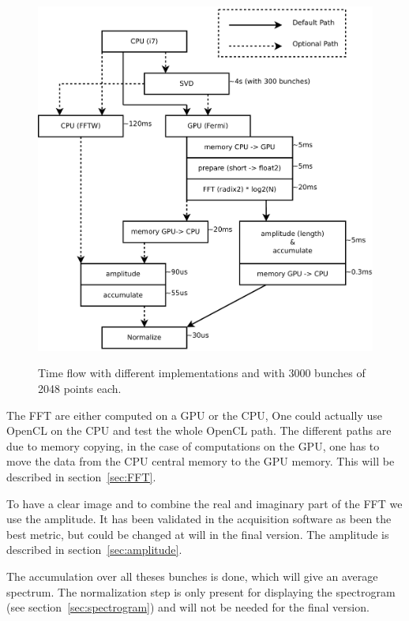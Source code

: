\begin{figure}[H]
\caption{Time f\/low with different implementations and with 3000 bunches of 2048 points each.}
\centering
\includegraphics[scale=0.3]{PC-flow.pdf}
\label{fig:PCFlow}
\end{figure}

The \gls{FFT} are either computed on a \gls{GPU} or the \gls{CPU}, One could actually use \gls{OpenCL} on the \gls{CPU} and test the whole \gls{OpenCL} path. The different paths are due to memory copying, in the case of computations on the \gls{GPU}, one has to move the data from the \gls{CPU} central memory to the \gls{GPU} memory. This will be described in section~\ref{sec:FFT}.

To have a clear image and to combine the real and imaginary part of the \gls{FFT} we use the amplitude. It has been validated in the acquisition software as been the best metric, but could be changed at will in the final version. The amplitude is described in section~\ref{sec:amplitude}.

The accumulation over all theses bunches is done, which will give an average spectrum. The normalization step is only present for displaying the spectrogram (see section~\ref{sec:spectrogram}) and will not be needed for the final version.

